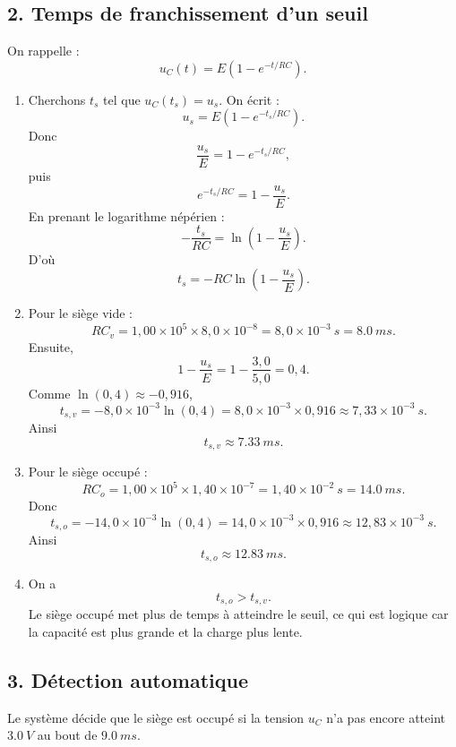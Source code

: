 \documentclass[11pt,a4paper]{article}
\begin{document}
\subsection*{2. Temps de franchissement d'un seuil}

On rappelle :
\[
u_C(t)=E\left(1-e^{-t/RC}\right).
\]

\begin{enumerate}
    \item Cherchons \(t_s\) tel que \(u_C(t_s)=u_s\). On écrit :
    \[
    u_s=E\left(1-e^{-t_s/RC}\right).
    \]
    Donc
    \[
    \frac{u_s}{E}=1-e^{-t_s/RC},
    \]
    puis
    \[
    e^{-t_s/RC}=1-\frac{u_s}{E}.
    \]
    En prenant le logarithme népérien :
    \[
    -\frac{t_s}{RC}=\ln\left(1-\frac{u_s}{E}\right).
    \]
    D'où
    \[
    t_s=-RC\ln\left(1-\frac{u_s}{E}\right).
    \]

    \item Pour le siège vide :
    \[
    RC_v=1{,}00\times10^5\times8{,}0\times10^{-8}
    =8{,}0\times10^{-3}\ \si{s}
    =\SI{8.0}{ms}.
    \]
    Ensuite,
    \[
    1-\frac{u_s}{E}=1-\frac{3{,}0}{5{,}0}=0{,}4.
    \]
    Comme \(\ln(0{,}4)\approx -0{,}916\),
    \[
    t_{s,v}=-8{,}0\times10^{-3}\ln(0{,}4)
    =8{,}0\times10^{-3}\times0{,}916
    \approx 7{,}33\times10^{-3}\ \si{s}.
    \]
    Ainsi
    \[
    t_{s,v}\approx \SI{7.33}{ms}.
    \]

    \item Pour le siège occupé :
    \[
    RC_o=1{,}00\times10^5\times1{,}40\times10^{-7}
    =1{,}40\times10^{-2}\ \si{s}
    =\SI{14.0}{ms}.
    \]
    Donc
    \[
    t_{s,o}=-14{,}0\times10^{-3}\ln(0{,}4)
    =14{,}0\times10^{-3}\times0{,}916
    \approx 12{,}83\times10^{-3}\ \si{s}.
    \]
    Ainsi
    \[
    t_{s,o}\approx \SI{12.83}{ms}.
    \]

    \item On a
    \[
    t_{s,o}>t_{s,v}.
    \]
    Le siège occupé met plus de temps à atteindre le seuil, ce qui est logique car la capacité est plus grande et la charge plus lente.
\end{enumerate}

\subsection*{3. Détection automatique}

Le système décide que le siège est occupé si la tension \(u_C\) n'a pas encore atteint \(\SI{3.0}{V}\) au bout de \(\SI{9.0}{ms}\).
\end{document}
